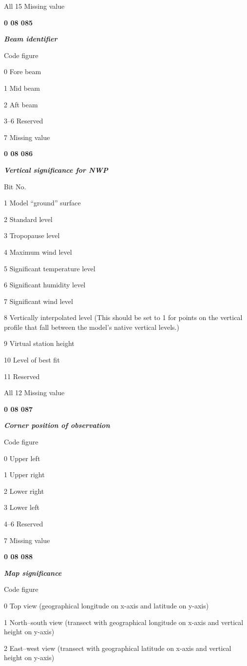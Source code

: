 All 15 Missing value

\textbf{0 08 085}

\emph{\textbf{Beam identifier}}

Code figure

0 Fore beam

1 Mid beam

2 Aft beam

3--6 Reserved

7 Missing value

\textbf{0 08 086}

\emph{\textbf{Vertical significance for NWP}}

Bit No.

1 Model ``ground'' surface

2 Standard level

3 Tropopause level

4 Maximum wind level

5 Significant temperature level

6 Significant humidity level

7 Significant wind level

8 Vertically interpolated level (This should be set to 1 for points on the vertical profile that fall between the model's native vertical levels.)

9 Virtual station height

10 Level of best fit

11 Reserved

All 12 Missing value

\textbf{0 08 087}

\emph{\textbf{Corner position of observation}}

Code figure

0 Upper left

1 Upper right

2 Lower right

3 Lower left

4--6 Reserved

7 Missing value

\textbf{0 08 088}

\emph{\textbf{Map significance}}

Code figure

0 Top view (geographical longitude on x-axis and latitude on y-axis)

1 North--south view (transect with geographical longitude on x-axis and vertical height on y-axis)

2 East--west view (transect with geographical latitude on x-axis and vertical height on y-axis)

